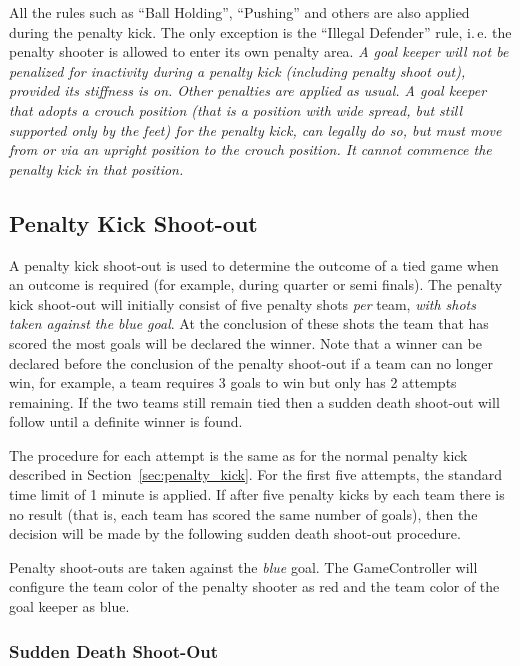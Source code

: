 \documentclass[12pt]{article}
\newcommand{\ie}{\mbox{i.\,e.}\xspace}
\begin{document}
All the rules such as ``Ball Holding'', ``Pushing'' and others are also applied during the penalty kick. The only exception is the ``Illegal Defender'' rule, \ie the penalty shooter is allowed to enter its own penalty area.
\emph{A goal keeper will not be penalized for inactivity during a penalty kick (including penalty shoot out), provided its stiffness is on. Other penalties are applied as usual.
A goal keeper that adopts a crouch position (that is a position with wide spread, but still supported only by the feet) for the penalty kick, can legally do so, but must move from or via an upright position to the crouch position. It cannot commence the penalty kick in that position.}

\subsection{Penalty Kick Shoot-out}
\label{sec:penalty_shoot-out}

A penalty kick shoot-out is used to determine the outcome of a tied game when an outcome is required (for example, during quarter or semi finals). The penalty kick shoot-out will initially consist of five penalty shots \emph{per} team,
\emph{with shots taken against the blue goal}. At the conclusion of these shots the team that has scored the most goals will be declared the winner. Note that a winner can be declared before the conclusion of the penalty shoot-out if a team can no longer win, for example, a team requires 3 goals to win but only has 2 attempts remaining. If the two teams still remain tied then a sudden death shoot-out will follow until a definite winner is found.

The procedure for each attempt is the same as for the normal penalty kick described in Section~\ref{sec:penalty_kick}. For the first five attempts, the standard time limit of 1 minute is applied. If after five penalty kicks by each team there is no result (that is, each team has scored the same number of goals), then the decision will be made by the following sudden death shoot-out procedure.

Penalty shoot-outs are taken against the \emph{blue} goal. The GameController will configure the team color of the penalty shooter as red and the team color of the goal keeper as blue.

\subsubsection{Sudden Death Shoot-Out}
\end{document}
